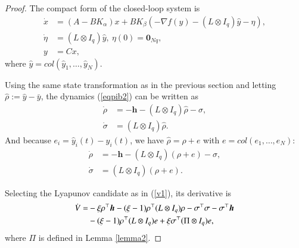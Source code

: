 \documentclass[final,5p,times,twocolumn,authoryear]{elsarticle}
\begin{document}
\begin{proof}
	The compact form of the closed-loop system is
	\begin{subequations}\label{eqpib2}
		\begin{align}
			\dot x&=(A-BK_\alpha)x+BK_\beta(-\nabla f(y)-(L\otimes I_q)\hat y-\eta),\label{eqpib2a}\\
			\dot\eta&=(L\otimes I_q)\hat y,\ \eta(0)=\boldsymbol 0_{Nq},\label{eqpib2b}\\
			y&=Cx,\label{eqpib2c}
		\end{align}
	\end{subequations}
	where $\hat y=col(\hat y_1,\dots,\hat y_N)$.
	
	Using the same state transformation as in the previous section and letting $\hat\rho:=\hat y-\bar{y}$, the dynamics (\ref{eqpib2}) can be written as
	\begin{subequations}\label{eqpib3}
		\begin{align}
			\dot{\rho}&=-\boldsymbol h-(L\otimes I_q)\hat\rho-\sigma,\label{eqpib3a}\\
			\dot{\sigma}&=(L\otimes I_q)\hat\rho\label{eqpib3b}.
		\end{align}
	\end{subequations}
	And because $e_i=\hat y_i(t)-y_i(t)$, we have $\hat\rho=\rho+e$ with $e=col(e_1, \dots, e_N)$:
	\begin{subequations}\label{eq1pib4}
		\begin{align}
			\dot{\rho}&=-\boldsymbol h-(L\otimes I_q)(\rho+e)-\sigma,\label{eqpib4a}\\
			\dot{\sigma}&=(L\otimes I_q)(\rho+e)\label{eqpib4b}.
		\end{align}
	\end{subequations}
	
	Selecting the Lyapunov candidate as in (\ref{v1}), its derivative is
	\begin{align}
		\dot V = &-\xi\rho^\top \boldsymbol h - (\xi-1)\rho^\top (L\otimes I_q)\rho - \sigma^\top \sigma - \sigma^\top \boldsymbol h\notag\\
		&-(\xi-1)\rho^\top (L\otimes I_q)e+\xi\sigma^\top (\Pi\otimes I_q)e,\label{v2'}
	\end{align}
	where $\Pi$ is defined in Lemma \autoref{lemma2}.
	

\end{proof}
\end{document}
